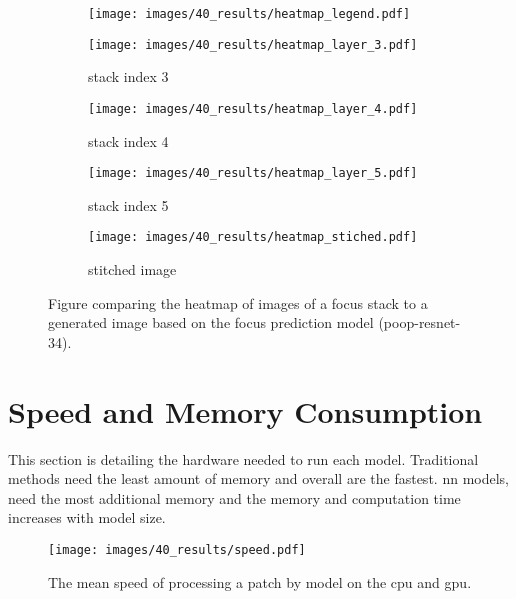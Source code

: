 \begin{figure}
    \centering
    \begin{subfigure}[b]{\textwidth}
        \centering
        \texttt{[image: images/40\_results/heatmap\_legend.pdf]}
    \end{subfigure}
    \begin{subfigure}[b]{0.5\textwidth}
        \centering
        \caption{stack index 3}
        \texttt{[image: images/40\_results/heatmap\_layer\_3.pdf]}
        \label{fig:Results:Stack:HeatMap:Stack3}
    \end{subfigure}%
    \begin{subfigure}[b]{0.5\textwidth}
        \centering
        \caption{stack index 4}
        \texttt{[image: images/40\_results/heatmap\_layer\_4.pdf]}
        \label{fig:Results:Stack:HeatMap:Stack4}
    \end{subfigure}
    \par
    \begin{subfigure}[b]{0.5\textwidth}
        \centering
        \caption{stack index 5}
        \texttt{[image: images/40\_results/heatmap\_layer\_5.pdf]}
        \label{fig:Results:Stack:HeatMap:Stack5}
    \end{subfigure}%
    \begin{subfigure}[b]{0.5\textwidth}
        \centering
        \caption{stitched image}
        \texttt{[image: images/40\_results/heatmap\_stiched.pdf]}
        \label{fig:Results:Stack:HeatMap:Stiched}
    \end{subfigure}
    \caption{Figure comparing the heatmap of images of a focus stack to a generated image based on the focus prediction model (\acs{poop}-\acs{resnet}-34).}
    \label{fig:Results:Stack:HeatMap}
\end{figure}

\section{Speed and Memory Consumption}
\label{sec:Results:Computation}

This section is detailing the hardware needed to run each model. Traditional methods need the least amount of memory and overall are the fastest. \Acl{nn} models, need the most additional memory and the memory and computation time increases with model size. 


\begin{figure}
    \centering
    \texttt{[image: images/40\_results/speed.pdf]}
    \caption{The mean speed of processing a patch by model on the \ac{cpu} and \ac{gpu}.}
    \label{fig:Results:Computation:Speed}
\end{figure}

